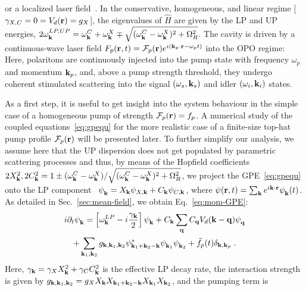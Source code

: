 or a localized laser field~\cite{Amo_2009,Amo_2010,Zajac_2012}.
%
In the conservative, homogeneous, and linear regime [$\gamma_{X,C}=0=
V_d (\mathbf{r})= g_X$], the eigenvalues of $\hat{H}$ are given by the
LP and UP energies, $2
\omega_{\mathbf{k}}^{LP,UP} = \omega_{\mathbf{k}}^{C} +
\omega_{\mathbf{k}}^{X} \mp \sqrt{(\omega_{\mathbf{k}}^{C} -
  \omega_{\mathbf{k}}^{X})^2 + \Omega_R^2}$.
%
The cavity is driven by a continuous-wave laser field $F_p(\mathbf{r},t)
= \mathcal{F}_p(\mathbf{r}) e^{i (\mathbf{k}_p \cdot \mathbf{r} - \omega_p
  t)}$ into the OPO regime: Here, polaritons are continuously injected
into the pump state with frequency $\omega_p$ and momentum
$\mathbf{k}_p$, and, above a pump strength threshold, they undergo coherent
stimulated scattering into the signal $(\omega_s, \mathbf{k}_s)$ and
idler $(\omega_i, \mathbf{k}_i)$ states. 

As a first step, it is useful to get insight into the system behaviour
in the simple case of a homogeneous pump of strength
$\mathcal{F}_p(\mathbf{r}) = f_p$. A numerical study of the coupled
equations~\eqref{eq:gpequ} for the more realistic case of a
finite-size top-hat pump profile $\mathcal{F}_p(\mathbf{r})$ will be
presented later.
%
To further simplify our analysis, we assume here that the UP
dispersion does not get populated by parametric scattering processes
and thus, by means of the Hopfield coefficients
$2X_{\mathbf{k}}^2, 2C_{\mathbf{k}}^2 = 1 \pm (\omega_{\mathbf{k}}^{C} -
\omega_{\mathbf{k}}^{X})/\sqrt{(\omega_{\mathbf{k}}^{C} -
  \omega_{\mathbf{k}}^{X})^2 + \Omega_R^2}$, we project the
GPE~\eqref{eq:gpequ} onto the LP
component~\cite{Ciuti_2001,Wouters_2007_b}
$\psi_{\mathbf{k}}^{} = X_{\mathbf{k}} \psi_{X,\mathbf{k}} + C_{\mathbf{k}}
\psi_{C,\mathbf{k}}$, where
$\psi(\mathbf{r},t) = \sum_{\mathbf{k}} e^{i\mathbf{k}\cdot \mathbf{r}}
\psi_{\mathbf{k}}^{} (t)$. As detailed in Sec.~\ref{sec:mean-field}, we
obtain Eq.~\eqref{eq:mom-GPE}:
%
\begin{multline}
  i\partial_t \psi_{\mathbf{k}}^{} = \left[\omega_{\mathbf{k}}^{LP} -
    i\frac{\gamma_{\mathbf{k}}}{2}\right]\psi_{\mathbf{k}}^{} +
  C_{\mathbf{k}} \sum_{\mathbf{q}} C_{\mathbf{q}} V_d(\mathbf{k} - \mathbf{q})
  \psi_{\mathbf{q}}^{}\\ + \sum_{\mathbf{k}_1, \mathbf{k}_2} g_{\mathbf{k},
    \mathbf{k}_1, \mathbf{k}_2} \psi^*_{\mathbf{k}_1 + \mathbf{k}_2-\mathbf{k}}
  \psi_{\mathbf{k}_1}^{} \psi_{\mathbf{k}_2}^{} + \tilde{f}_p(t)
  \delta_{\mathbf{k},\mathbf{k}_p}\; .
\label{eq:efflp}
\end{multline}
%
Here, $\gamma_{\mathbf{k}}=\gamma_X X_{\mathbf{k}}^2 + \gamma_C C_{\mathbf{k}}^2$
is the effective LP decay rate, the interaction strength is given by
$g_{\mathbf{k}, \mathbf{k}_1, \mathbf{k}_2}=g_X X_{\mathbf{k}} X_{\mathbf{k}_1 +
  \mathbf{k}_2-\mathbf{k}} X_{\mathbf{k}_1} X_{\mathbf{k}_2}$, and the pumping term is
